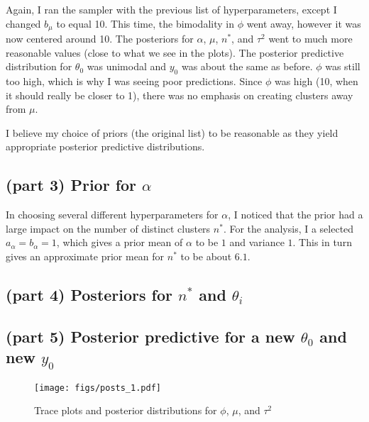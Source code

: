 \documentclass[12pt]{article}
\begin{document}
Again, I ran the sampler with the previous list of hyperparameters, except I changed $b_\mu$ to equal 10. This time, the bimodality in $\phi$ went away, however it was now centered around 10. The posteriors for $\alpha$, $\mu$, $n^*$, and $\tau^2$ went to much more reasonable values (close to what we see in the plots). The posterior predictive distribution for $\theta_0$ was unimodal and $y_0$ was about the same as before. $\phi$ was still too high, which is why I was seeing poor predictions. Since $\phi$ was high (10, when it should really be closer to 1), there was no emphasis on creating clusters away from $\mu$.

I believe my choice of priors (the original list) to be reasonable as they yield appropriate posterior predictive distributions.

\subsection*{(part 3) Prior for $\alpha$}

In choosing several different hyperparameters for $\alpha$, I noticed that the prior had a large impact on the number of distinct clusters $n^*$. For the analysis, I a selected $a_\alpha=b_\alpha=1$, which gives a prior mean of $\alpha$ to be $1$ and variance $1$. This in turn gives an approximate prior mean for $n^*$ to be about $6.1$.

\subsection*{(part 4) Posteriors for $n^*$ and $\theta_i$}

\subsection*{(part 5) Posterior predictive for a new $\theta_0$ and new $y_0$}
 
\newpage


\begin{figure}[H]
\begin{center}
\texttt{[image: figs/posts\_1.pdf]}
\caption{Trace plots and posterior distributions for $\phi$, $\mu$, and $\tau^2$}
\end{center}
\end{figure}
\end{document}
